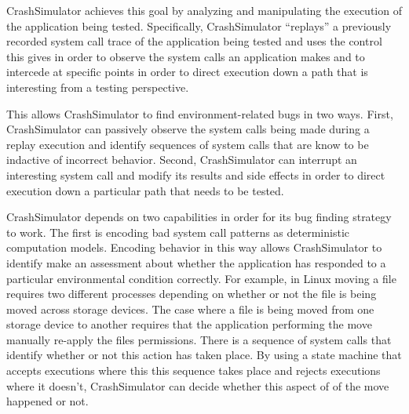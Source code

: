 

CrashSimulator achieves this goal by analyzing and manipulating the execution of the application being tested.
Specifically, CrashSimulator ``replays'' a previously recorded system call trace of the application being tested and
uses the control this gives in order to observe the system calls an application makes and to intercede at specific
points in order to direct execution down a path that is interesting from a testing perspective.

This allows CrashSimulator to find environment-related bugs in two ways.  First, CrashSimulator can passively observe
the system calls being made during a replay execution and identify sequences of system calls that are know to be
indactive of incorrect behavior.  Second, CrashSimulator can interrupt an interesting system call and modify its results
and side effects in order to direct execution down a particular path that needs to be tested.

CrashSimulator depends on two capabilities in order for its bug finding strategy to work.  The first is encoding bad
system call patterns as deterministic computation models.  Encoding behavior in this way allows CrashSimulator to
identify make an assessment about whether the application has responded to a particular environmental condition
correctly.  For example, in Linux moving a file requires two different processes depending on whether or not the file is
being moved across storage devices.  The case where a file is being moved from one storage device to another requires
that the application performing the move manually re-apply the files permissions.  There is a sequence of system calls
that identify whether or not this action has taken place.  By using a state machine that accepts executions where this
this sequence takes place and rejects executions where it doesn't, CrashSimulator can decide whether this aspect of of
the move happened or not.

